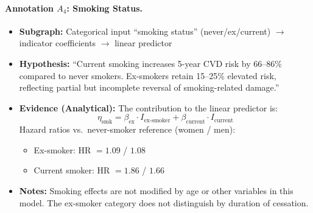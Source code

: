 \documentclass{article}
\begin{document}
\paragraph{Annotation $A_4$: Smoking Status.}
\begin{itemize}
    \item \textbf{Subgraph:} Categorical input ``smoking status'' (never/ex/current) $\rightarrow$ indicator coefficients $\rightarrow$ linear predictor
    \item \textbf{Hypothesis:} ``Current smoking increases 5-year CVD risk by 66--86\% compared to never smokers. Ex-smokers retain 15--25\% elevated risk, reflecting partial but incomplete reversal of smoking-related damage.''
    \item \textbf{Evidence (Analytical):} The contribution to the linear predictor is:
    \[
    \eta_{\text{smk}} = \beta_{\text{ex}} \cdot I_{\text{ex-smoker}} + \beta_{\text{current}} \cdot I_{\text{current}}
    \]
    Hazard ratios vs.\ never-smoker reference (women / men):
    \begin{itemize}
        \item Ex-smoker: HR $= 1.09$ / $1.08$   
        \item Current smoker: HR $= 1.86$ / $1.66$
    \end{itemize}
    \item \textbf{Notes:} Smoking effects are not modified by age or other variables in this model. The ex-smoker category does not distinguish by duration of cessation.
\end{itemize}
\end{document}
